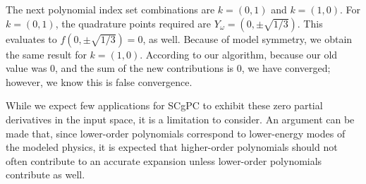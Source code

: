 The next polynomial
index set combinations are $k=(0,1)$ and $k=(1,0)$.  For $k=(0,1)$, the quadrature points required are
$Y_\omega=(0,\pm\sqrt{1/3})$.  This evaluates to $f(0,\pm\sqrt{1/3})=0$, as well.  Because of model symmetry, we obtain the
same result for $k=(1,0)$.  According to our algorithm, because our old value was 0, and the sum of the new
contributions is 0, we have converged; however, we know this is false convergence.  

While we expect few
applications for SCgPC to exhibit these zero partial derivatives in the input space, it is a limitation to
consider.  An argument can be made that, since lower-order polynomials correspond to lower-energy modes of the
modeled physics, it is expected that higher-order polynomials should not often contribute to an accurate
expansion unless lower-order polynomials contribute as well.
